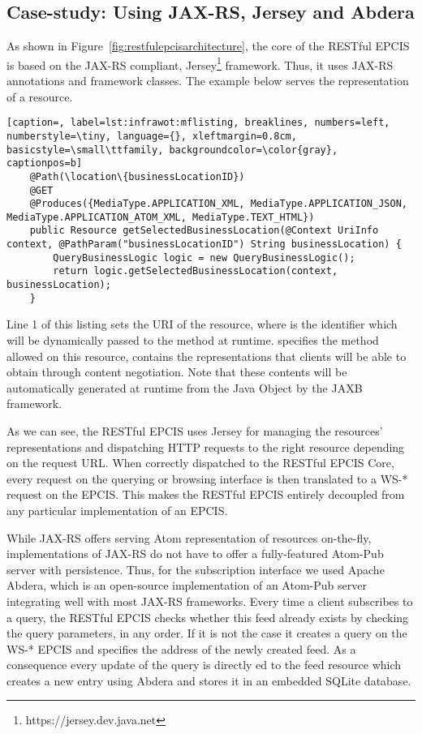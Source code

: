 \subsection{Case-study: Using JAX-RS, Jersey and Abdera}
As shown in Figure~\ref{fig:restfulepcisarchitecture}, the core of the RESTful EPCIS is based on the JAX-RS compliant, Jersey\footnote{https://jersey.dev.java.net} framework. Thus, it uses JAX-RS annotations and framework classes. The example below serves the representation of a  resource.
\begin{lstlisting}[caption=, label=lst:infrawot:mflisting, breaklines, numbers=left, numberstyle=\tiny, language={}, xleftmargin=0.8cm, basicstyle=\small\ttfamily, backgroundcolor=\color{gray}, captionpos=b]
    @Path(\location\{businessLocationID})
    @GET
    @Produces({MediaType.APPLICATION_XML, MediaType.APPLICATION_JSON, MediaType.APPLICATION_ATOM_XML, MediaType.TEXT_HTML})
    public Resource getSelectedBusinessLocation(@Context UriInfo context, @PathParam("businessLocationID") String businessLocation) {
        QueryBusinessLogic logic = new QueryBusinessLogic();
        return logic.getSelectedBusinessLocation(context, businessLocation);
    }
\end{lstlisting}
Line 1 of this listing sets the URI of the resource, where  is the  identifier which will be dynamically passed to the method  at runtime.  specifies the method allowed on this resource,  contains the representations that clients will be able to obtain through content negotiation. Note that these contents will be automatically generated at runtime from the  Java Object by the JAXB framework.

As we can see, the RESTful EPCIS uses Jersey for managing the resources' representations and dispatching HTTP requests to the right resource depending on the request URL. When correctly dispatched to the RESTful EPCIS Core, every request on the querying or browsing interface is then translated to a WS-* request on the EPCIS. This makes the RESTful EPCIS entirely decoupled from any particular implementation of an EPCIS.

While JAX-RS offers serving Atom representation of resources on-the-fly, implementations of JAX-RS do not have to offer a fully-featured Atom-Pub server with persistence. Thus, for the subscription interface we used Apache Abdera, which is an open-source implementation of an Atom-Pub server integrating well with most JAX-RS frameworks. Every time a client subscribes to a query, the RESTful EPCIS checks whether this feed already exists by checking the query parameters, in any order. If it is not the case it creates a query on the WS-* EPCIS and specifies the address of the newly created feed. As a consequence every update of the query is directly ed to the feed resource which creates a new entry using Abdera and stores it in an embedded SQLite database.

